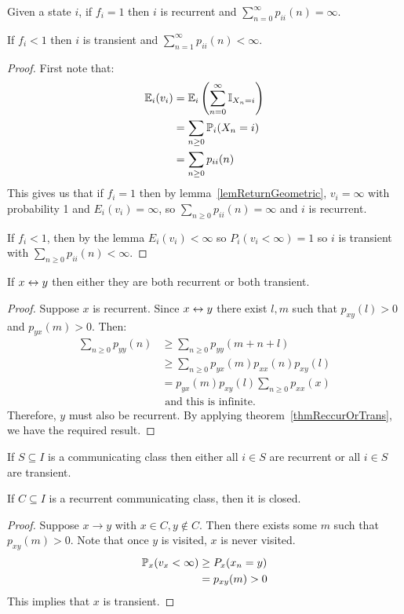 \documentclass[../Main.tex]{subfiles}
\begin{document}
\begin{theorem}
    Given a state $i$, if $f_i = 1$ then $i$ is recurrent and $\sum_{n=0}^{\infty} p_{ii}(n) = \infty$.

    If $f_i < 1$ then $i$ is transient and $\sum_{n=1}^{\infty} p_{ii}(n) < \infty$.
    \label{thmReccurOrTrans}
\end{theorem}
\begin{proof}
    First note that:
    \begin{align*}
        \E_i(v_i) &= \E_i \left(\sum_{n=0}^{\infty} \mathbb{I}_{X_n = i}\right) \\
        &= \sum_{n \geq 0} \P_i(X_n = i) \\
        &= \sum_{n \geq 0} p_{ii}(n)
    \end{align*}
    This gives us that if $f_i = 1$ then by lemma~\ref{lemReturnGeometric}, $v_i = \infty$ with probability 1 and $E_i(v_i) = \infty$, so $\sum_{n\geq 0} p_{ii}(n) = \infty$ and $i$ is recurrent.

    If $f_i < 1$, then by the lemma $E_i(v_i) < \infty$ so $P_i(v_i < \infty) = 1$ so $i$ is transient with $\sum_{n \geq 0} p_{ii}(n) < \infty$.
\end{proof}
\begin{theorem}
    If $x \comms y$ then either they are both recurrent or both transient.
    \label{thmRecurrenceCommunicates}
\end{theorem}
\begin{proof}
    Suppose $x$ is recurrent. Since $x \comms y$ there exist $l, m$ such that $p_{xy}(l) > 0$ and $p_{yx}(m) > 0$. Then:
    \begin{align*}
        \sum_{n \geq 0} p_{yy}(n) &\geq \sum_{n \geq 0} p_{yy}(m + n + l) \\
        &\geq \sum_{n \geq 0}p_{yx}(m) p_{xx}(n) p_{xy}(l) \\
        &= p_{yx}(m) p_{xy}(l)\sum_{n \geq 0} p_{xx}(x) \\ 
        &\text{ and this is infinite.}
    \end{align*}
    Therefore, $y$ must also be recurrent. By applying theorem~\ref{thmReccurOrTrans}, we have the required result.
\end{proof}
\begin{corollary}
    If $S \subseteq I$ is a communicating class then either all $i \in S$ are recurrent or all $i \in S$ are transient.
    \label{corComClassRecur}
\end{corollary}
\begin{theorem}
    If $C \subseteq I$ is a recurrent communicating class, then it is closed.
    \label{thmRecurCommClosed}
\end{theorem}
\begin{proof}
    Suppose $x \to y$ with $x \in C, y \notin C$. Then there exists some $m$ such that $p_{xy}(m) > 0$. Note that once $y$ is visited, $x$ is never visited.
    \begin{align*}
        \P_x(v_x < \infty) &\geq P_x(x_n = y) \\
        &= p_{xy}(m) > 0
    \end{align*}
    This implies that $x$ is transient.\contradiction
\end{proof}
\end{document}

